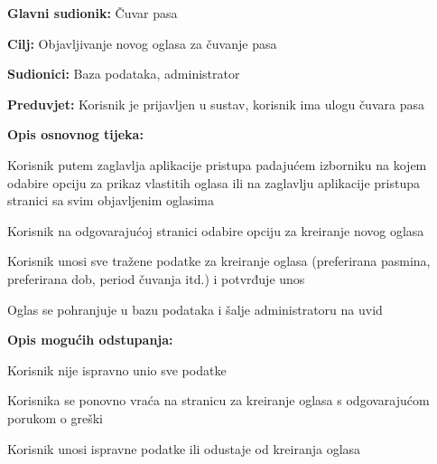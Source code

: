 					\noindent {}
					\begin{packed_item}
						
						\item \textbf{Glavni sudionik: } Čuvar pasa
						\item  \textbf{Cilj:} Objavljivanje novog oglasa za čuvanje pasa
						\item  \textbf{Sudionici:} Baza podataka, administrator
						\item  \textbf{Preduvjet:} Korisnik je prijavljen u sustav, korisnik ima ulogu čuvara pasa
						\item  \textbf{Opis osnovnog tijeka:}
						
						\item[] \begin{packed_enum}
							
							\item Korisnik putem zaglavlja aplikacije pristupa padajućem izborniku na kojem odabire opciju za prikaz vlastitih oglasa ili na zaglavlju aplikacije pristupa stranici sa svim objavljenim oglasima
							\item Korisnik na odgovarajućoj stranici odabire opciju za kreiranje novog oglasa
							\item Korisnik unosi sve tražene podatke za kreiranje oglasa (preferirana pasmina, preferirana dob, period čuvanja itd.) i potvrđuje unos
							\item Oglas se pohranjuje u bazu podataka i šalje administratoru na uvid
							
						\end{packed_enum}
						
						\item  \textbf{Opis mogućih odstupanja:}
						
						\item[] \begin{packed_item}
							
							\item[3.a] Korisnik nije ispravno unio sve podatke
							\item[] \begin{packed_enum}
								
								\item Korisnika se ponovno vraća na stranicu za kreiranje oglasa s odgovarajućom porukom o greški 
								\item Korisnik unosi ispravne podatke ili odustaje od kreiranja oglasa
								
							\end{packed_enum}
						\end{packed_item}
					\end{packed_item}	
				

